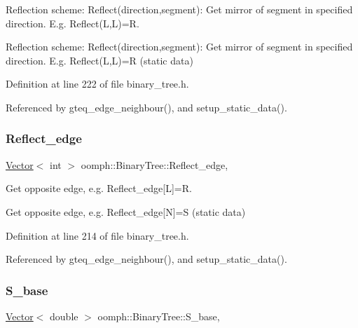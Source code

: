 Reflection scheme\+: Reflect(direction,segment)\+: Get mirror of segment in specified direction. E.\+g. Reflect(\+L,\+L)=R. 

Reflection scheme\+: Reflect(direction,segment)\+: Get mirror of segment in specified direction. E.\+g. Reflect(\+L,\+L)=R (static data) 

Definition at line 222 of file binary\+\_\+tree.\+h.



Referenced by gteq\+\_\+edge\+\_\+neighbour(), and setup\+\_\+static\+\_\+data().

\mbox{\label{classoomph_1_1BinaryTree_af44e99a31403858e88fe62294eb40770}} 
\subsubsection{\texorpdfstring{Reflect\+\_\+edge}{Reflect\_edge}}
{\footnotesize\ttfamily \hyperlink{classoomph_1_1Vector}{Vector}$<$ int $>$ oomph\+::\+Binary\+Tree\+::\+Reflect\+\_\+edge\hspace{0.3cm}{\ttfamily [static]}, {\ttfamily [private]}}



Get opposite edge, e.\+g. Reflect\+\_\+edge\mbox{[}L\mbox{]}=R. 

Get opposite edge, e.\+g. Reflect\+\_\+edge\mbox{[}N\mbox{]}=S (static data) 

Definition at line 214 of file binary\+\_\+tree.\+h.



Referenced by gteq\+\_\+edge\+\_\+neighbour(), and setup\+\_\+static\+\_\+data().

\mbox{\label{classoomph_1_1BinaryTree_a0071402257f6137a0bb19dd702665a92}} 
\subsubsection{\texorpdfstring{S\+\_\+base}{S\_base}}
{\footnotesize\ttfamily \hyperlink{classoomph_1_1Vector}{Vector}$<$ double $>$ oomph\+::\+Binary\+Tree\+::\+S\+\_\+base\hspace{0.3cm}{\ttfamily [static]}, {\ttfamily [private]}}




